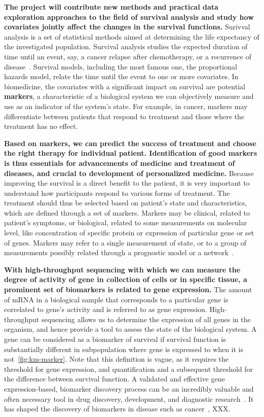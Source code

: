 \documentclass[11pt,a4paper]{article}
\begin{document}
{\bf The project will contribute new methods and practical data exploration approaches to the field of survival analysis and study how covariates jointly affect the changes in the survival functions.} Surivval analysis is a set of statistical methods aimed at determining the life expectancy of the investigated population. Survival analysis studies the expected duration of time until an event, say, a cancer relapse after chemotherapy, or a recurrence of disease~\cite{pazdur2008endpoints}. Survival models, including the most famous one, the proportional hazards model, relate the time until the event to one or more covariates. In biomedicine, the covariates with a significant impact on survival are potential {\bf markers}, a characteristic of a biological system we can objectively measure and use as an indicator of the system's state. For example, in cancer, markers may differentiate between patients that respond to treatment and those where the treatment has no effect. 

{\bf Based on markers, we can predict the success of treatment and choose the right therapy for individual patient. Identification of good markers is thus essentials for advancements of medicine and treatment of diseases, and crucial to development of personalized medicine.} Because improving the survival is a direct benefit to the patient, it is very important to understand how participants respond to various forms of treatment. The treatment should thus be selected based on patient's state and characteristics, which are defined through a set of markers. Markers may be clinical, related to patient's symptoms, or biological, related to some measurements on molecular level, like concentration of specific protein or expression of particular gene or set of genes. Markers may refer to a single measurement of state, or to a group of measurements possibly related through a prognostic model or a network~\cite{Sonawane2019}.

{\bf With high-throughput sequencing with which we can measure the degree of activity of gene in collection of cells or in specific tissue, a prominent set of biomarkers is related to gene expression.} The amount of mRNA in a biological sample that corresponds to a particular gene is correlated to gene's activity and is referred to as gene expression. High-throughput sequencing allows us to determine the expression of all genes in the organism, and hence provide a tool to assess the state of the biological system. A gene can be considered as a biomarker of survival if survival function is substantially different in subpopulation where gene is expressed to when it is not~\ref{fig:km-marker}. Note that this definition is vague, as it requires the threshold for gene expression, and quantification and a subsequent threshold for the difference between survival function. A validated and effective gene expression-based, biomarker discovery process can be an incredibly valuable and often necessary tool in drug discovery, development, and diagnostic research~\cite{MonforteMcPhail2005}. It has shaped the discovery of biomarkers in disease such as cancer~\cite{HENRY2012140}, XXX.
\end{document}
